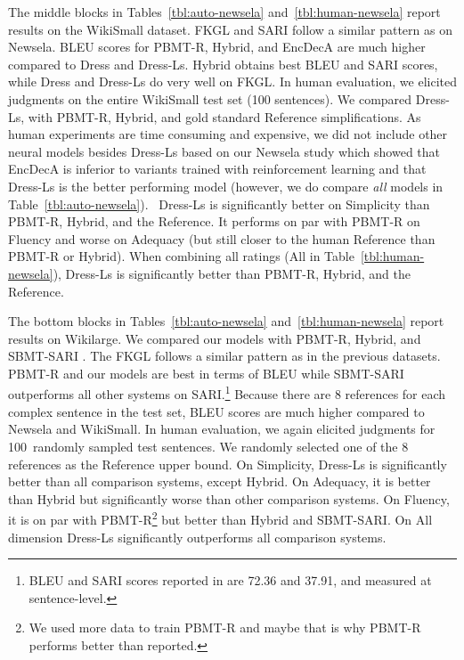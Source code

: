\documentclass[11pt,letterpaper]{article}
\begin{document}
The middle blocks in Tables~\ref{tbl:auto-newsela}
and~\ref{tbl:human-newsela} report results on the WikiSmall
dataset. FKGL and SARI follow a similar pattern as on Newsela. BLEU
scores for PBMT-R, Hybrid, and EncDecA are much higher compared to
{\sc Dress} and \mbox{{\sc Dress-Ls}}. Hybrid obtains best BLEU and
SARI scores, while {\sc Dress} and \mbox{{\sc Dress-Ls}} do very well
on FKGL.  In human evaluation, we elicited judgments on the entire
WikiSmall test set (100 sentences). We compared \mbox{{\sc Dress-Ls}},
with \mbox{PBMT-R}, Hybrid, and gold standard Reference
simplifications. As human experiments are time consuming and
expensive, we did not include other neural models besides {\sc
  Dress-Ls} based on our Newsela study which showed that EncDecA is
inferior to variants trained with reinforcement learning and that {\sc
  Dress-Ls} is the better performing model (however, we do compare
\emph{all} models in Table~\ref{tbl:auto-newsela}). \mbox{{\sc
    Dress-Ls}} is significantly better on Simplicity than
\mbox{PBMT-R}, Hybrid, and the Reference.  It performs on par with
PBMT-R on Fluency and worse on Adequacy (but still closer to the human
Reference than \mbox{PBMT-R} or Hybrid). When combining all ratings
(All in Table~\ref{tbl:human-newsela}), \mbox{{\sc Dress-Ls}} is
significantly better than PBMT-R, Hybrid, and the \mbox{Reference}.










The bottom blocks in Tables~\ref{tbl:auto-newsela}
and~\ref{tbl:human-newsela} report results on Wikilarge. We compared
our models with PBMT-R, Hybrid, and \mbox{SBMT-SARI}
\cite{Xu_TACL16}. The FKGL follows a similar pattern as in the
previous datasets. PBMT-R and our models are best in terms of BLEU
while \mbox{SBMT-SARI} outperforms all other systems on
SARI.\footnote{BLEU and SARI scores reported in 
  are 72.36 and 37.91, and measured at sentence-level.} Because there
are 8 references for each complex sentence in the test set, BLEU
scores are much higher compared to Newsela and WikiSmall. In human
evaluation, we again elicited judgments for 100~randomly sampled test
sentences. We randomly selected one of the 8 references as the
Reference upper bound. On Simplicity, \mbox{{\sc Dress-Ls}} is
significantly better than all comparison systems, except Hybrid. On
Adequacy, it is better than Hybrid but significantly worse than other
comparison systems. On Fluency, it is on par with PBMT-R\footnote{We
  used more data to train PBMT-R and maybe that is why PBMT-R performs
  better than  reported.} but better than Hybrid
and SBMT-SARI. On All dimension \mbox{{\sc Dress-Ls}} significantly
outperforms all comparison systems.
\end{document}
